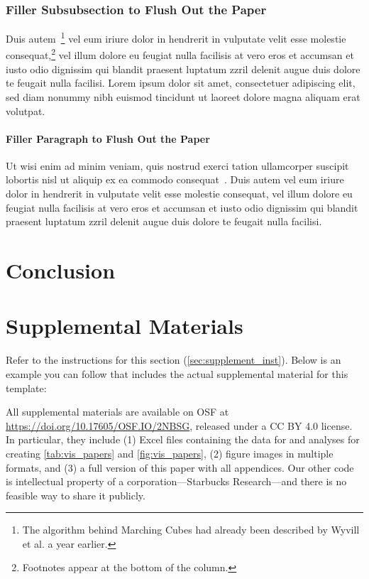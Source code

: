 \documentclass{vgtc}                          %
\begin{document}
\subsubsection{Filler Subsubsection to Flush Out the Paper}

Duis autem~\cite{Lorensen:1987:MCA}\footnote{The algorithm behind
Marching Cubes \cite{Lorensen:1987:MCA} had already been
described by Wyvill et al. \cite{Wyvill:1986:DSS} a year
earlier.} vel eum iriure dolor in hendrerit
in vulputate velit esse molestie consequat,\footnote{Footnotes
appear at the bottom of the column.} vel illum dolore eu
feugiat nulla facilisis at vero eros et accumsan et iusto odio
dignissim qui blandit praesent luptatum zzril delenit augue duis
dolore te feugait nulla facilisi. Lorem ipsum dolor sit amet,
consectetuer adipiscing elit, sed diam nonummy nibh euismod tincidunt
ut laoreet dolore magna aliquam erat volutpat.


\paragraph{Filler Paragraph to Flush Out the Paper}

Ut wisi enim ad minim veniam, quis nostrud exerci tation ullamcorper
suscipit lobortis nisl ut aliquip ex ea commodo
consequat~\cite{Nielson:1991:TAD}. Duis autem vel eum iriure dolor in
hendrerit in vulputate velit esse molestie consequat, vel illum dolore
eu feugiat nulla facilisis at vero eros et accumsan et iusto odio
dignissim qui blandit praesent luptatum zzril delenit augue duis
dolore te feugait nulla facilisi.


\section{Conclusion}

\lipsum[1]%

\section*{Supplemental Materials}
\label{sec:supplemental_materials}

Refer to the instructions for this section (\cref{sec:supplement_inst}).
Below is an example you can follow that includes the actual supplemental material for this template:

All supplemental materials are available on OSF at \url{https://doi.org/10.17605/OSF.IO/2NBSG}, released under a CC BY 4.0 license.
In particular, they include (1) Excel files containing the data for and analyses for creating \cref{tab:vis_papers} and \cref{fig:vis_papers}, (2) figure images in multiple formats, and (3) a full version of this paper with all appendices.
Our other code is intellectual property of a corporation---Starbucks Research---and there is no feasible way to share it publicly.
\end{document}
